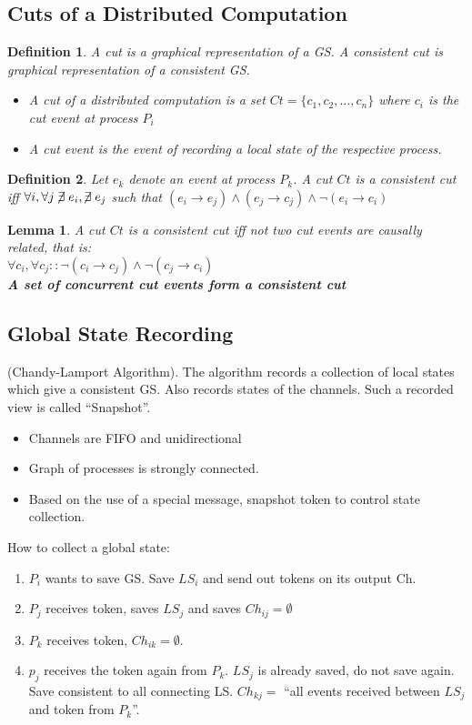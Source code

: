 \documentclass[a4paper]{article}
\newtheorem{definition}{Definition}
\newtheorem{lemma}{Lemma}
\begin{document}
\subsection{Cuts of a Distributed Computation}
\begin{definition}
	A cut is a graphical representation of a GS. A consistent cut is
	graphical representation of a consistent GS.
	\begin{itemize}
		\item A cut of a distributed computation is a set
			$Ct=\{c_1,c_2,\dots,c_n\}$ where $c_i$ is the cut event
			at process $P_i$
		\item A cut event is the event of recording a local state of the
			respective process.
	\end{itemize}
\end{definition}
\begin{definition}
	Let $e_k$ denote an event at process $P_k$. A cut $Ct$ is a consistent
	cut iff $\forall i, \forall j \centernot \exists e_i, \centernot \exists
	e_j $ such that $(e_i \rightarrow e_j) \land (e_j \rightarrow c_j) \land
	\lnot (e_i \rightarrow c_i)$
\end{definition}
\begin{lemma}
	A cut $Ct$ is a consistent cut iff not two cut events are causally
	related, that is:\\
	$\forall c_i, \forall c_j : : \lnot (c_i \rightarrow c_j) \land \lnot
	(c_j \rightarrow c_i)$\\
	\textbf{A set of concurrent cut events form a consistent cut}
\end{lemma}
\subsection{Global State Recording}
(Chandy-Lamport Algorithm). The algorithm records a collection of local states
which give a consistent GS. Also records states of the channels. Such a recorded
view is called ``Snapshot''. 
\begin{itemize}
	\item Channels are FIFO and unidirectional
	\item Graph of processes is strongly connected.
	\item Based on the use of a special message, snapshot token to control state
			collection.
\end{itemize}
How to collect a global state:
\begin{enumerate}
		\item $P_i$ wants to save GS. Save $LS_i$ and send out tokens on its
				output Ch.
		\item $P_j$ receives token, saves $LS_j$ and saves $Ch_{ij}=\emptyset$
		\item $P_k$ receives token, $Ch_{ik}=\emptyset$.
		\item $p_j$ receives the token again from $P_k$. $LS_j$ is already
				saved, do not save again. Save consistent to all connecting LS.
				$Ch_{kj}=$ ``all events received between $LS_j$ and token from
				$P_k$''.
\end{enumerate}
\end{document}
